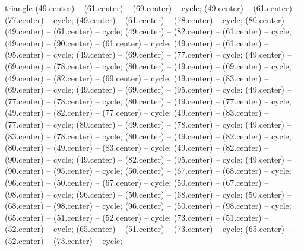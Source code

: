 {\begin{pgfonlayer}{triangle}
 (49.center) -- (61.center) -- (69.center) -- cycle; 
 (49.center) -- (61.center) -- (77.center) -- cycle; 
 (49.center) -- (61.center) -- (78.center) -- cycle; 
 (80.center) -- (49.center) -- (61.center) -- cycle; 
 (49.center) -- (82.center) -- (61.center) -- cycle; 
 (49.center) -- (90.center) -- (61.center) -- cycle; 
 (49.center) -- (61.center) -- (95.center) -- cycle; 
 (49.center) -- (69.center) -- (77.center) -- cycle; 
 (49.center) -- (69.center) -- (78.center) -- cycle; 
 (80.center) -- (49.center) -- (69.center) -- cycle; 
 (49.center) -- (82.center) -- (69.center) -- cycle; 
 (49.center) -- (83.center) -- (69.center) -- cycle; 
 (49.center) -- (69.center) -- (95.center) -- cycle; 
 (49.center) -- (77.center) -- (78.center) -- cycle; 
 (80.center) -- (49.center) -- (77.center) -- cycle; 
 (49.center) -- (82.center) -- (77.center) -- cycle; 
 (49.center) -- (83.center) -- (77.center) -- cycle; 
 (80.center) -- (49.center) -- (78.center) -- cycle; 
 (49.center) -- (83.center) -- (78.center) -- cycle; 
 (80.center) -- (49.center) -- (82.center) -- cycle; 
 (80.center) -- (49.center) -- (83.center) -- cycle; 
 (49.center) -- (82.center) -- (90.center) -- cycle; 
 (49.center) -- (82.center) -- (95.center) -- cycle; 
 (49.center) -- (90.center) -- (95.center) -- cycle; 
 (50.center) -- (67.center) -- (68.center) -- cycle; 
 (96.center) -- (50.center) -- (67.center) -- cycle; 
 (50.center) -- (67.center) -- (98.center) -- cycle; 
 (96.center) -- (50.center) -- (68.center) -- cycle; 
 (50.center) -- (68.center) -- (98.center) -- cycle; 
 (96.center) -- (50.center) -- (98.center) -- cycle; 
 (65.center) -- (51.center) -- (52.center) -- cycle; 
 (73.center) -- (51.center) -- (52.center) -- cycle; 
 (65.center) -- (51.center) -- (73.center) -- cycle; 
 (65.center) -- (52.center) -- (73.center) -- cycle; 

\end{pgfonlayer}}
